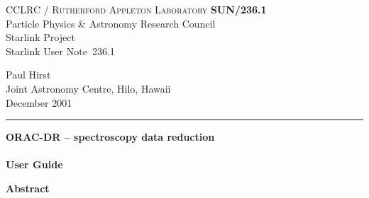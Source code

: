 \documentclass[twoside,11pt]{article}
\newcommand{\stardoccategory}  {Starlink User Note}
\newcommand{\stardocinitials}  {SUN}
\newcommand{\stardocnumber}    {236.1}
\newcommand{\stardocauthors}   {Paul Hirst \\
                                Joint Astronomy Centre, Hilo, Hawaii}
\newcommand{\stardocdate}      {December 2001}
\newcommand{\stardoctitle}     {ORAC-DR -- spectroscopy data reduction}
\newcommand{\stardocversion}   {}
\newcommand{\stardocmanual}    {User Guide}
\newcommand{\stardocname}{\stardocinitials /\stardocnumber}
\newenvironment{latexonly}{}{}
\renewcommand{\_}{\texttt{\symbol{95}}}
\begin{document}
\setcounter{secnumdepth}{5}
\thispagestyle{empty}

\begin{latexonly}
   CCLRC / \textsc{Rutherford Appleton Laboratory} \hfill \textbf{\stardocname}\\
   {\large Particle Physics \& Astronomy Research Council}\\
   {\large Starlink Project\\}
   {\large \stardoccategory\ \stardocnumber}
   \begin{flushright}
   \stardocauthors\\
   \stardocdate
   \end{flushright}
   \vspace{-4mm}
   \rule{\textwidth}{0.5mm}
   \vspace{5mm}
   \begin{center}
   {\Huge\textbf{\stardoctitle \\ [2.5ex]}}
   {\LARGE\textbf{\stardocversion \\ [4ex]}}
   {\Huge\textbf{\stardocmanual}}
   \end{center}
   \vspace{5mm}


   \vspace{10mm}
   \begin{center}
      {\Large\textbf{Abstract}}
   \end{center}
\end{latexonly}
\end{document}
